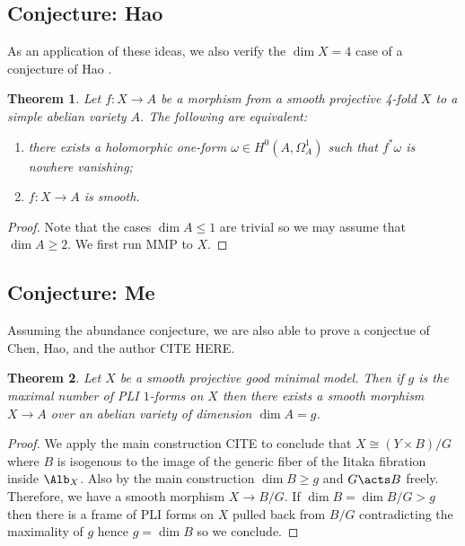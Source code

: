 \documentclass[12pt]{article}
\theoremstyle{plain}
\newtheorem{Lthm}{Theorem}
\begin{document}
\subsection{Conjecture: Hao}

As an application of these ideas, we also verify the $\dim{X} = 4$ case of a conjecture of Hao \cite[Conj.~1.5]{Hao23}.

\begin{Lthm}\label{thm:smooth_map_to_simpleAV}
Let $f : X \to A$ be a morphism from a smooth projective 4-fold $X$ to a simple abelian variety $A$. The following are equivalent:
\begin{enumerate}
\item there exists a holomorphic one-form $\omega \in H^0(A, \Omega^1_A)$ such that $f^{\ast}\omega$ is nowhere vanishing;
\item $f : X \to A$ is smooth.
\end{enumerate}
\end{Lthm}

\begin{proof}
Note that the cases $\dim{A} \le 1$ are trivial so we may assume that $\dim{A} \ge 2$. 
We first run MMP to $X$. 
\end{proof}


\subsection{Conjecture: Me}

Assuming the abundance conjecture, we are also able to prove a conjectue of Chen, Hao, and the author {\color{red} CITE HERE}. 

\begin{Lthm}\label{thm:smooth_map_to_simpleAV}
Let $X$ be a smooth projective good minimal model. Then if $g$ is the maximal number of PLI $1$-forms on $X$ then there exists a smooth morphism $X \to A$ over an abelian variety of dimension $\dim{A} = g$.
\end{Lthm}

\begin{proof}
We apply the main construction {\color{red} CITE} to conclude that $X \cong (Y \times B)/G$ where $B$ is isogenous to the image of the generic fiber of the Iitaka fibration inside $\Alb_X$. Also by the main construction $\dim{B} \ge g$ and $G \acts B$ freely. Therefore, we have a smooth morphism $X \to B / G$. If $\dim{B} = \dim{B/G} > g$ then there is a frame of PLI forms on $X$ pulled back from $B/G$ contradicting the maximality of $g$ hence $g = \dim{B}$ so we conclude.
\end{proof}
\end{document}
